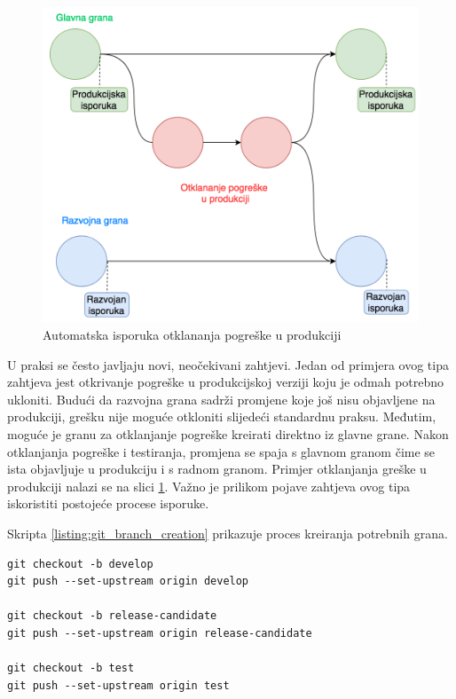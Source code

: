 \documentclass[times, utf8, diplomski, numeric]{fer}
\begin{document}
\begin{figure}[b!]
\centering
\includegraphics[scale=0.5]{HotfixGitflow}
\caption{Automatska isporuka otklananja pogreške u produkciji}
\label{fig:HotfixGitflow}
\end{figure}

U praksi se često javljaju novi, neočekivani zahtjevi. Jedan od primjera ovog tipa zahtjeva jest otkrivanje pogreške u produkcijskoj verziji koju je odmah potrebno ukloniti. Budući da razvojna grana sadrži promjene koje još nisu objavljene na produkciji, grešku nije moguće otkloniti slijedeći standardnu praksu. Međutim, moguće je granu za otklanjanje pogreške kreirati direktno iz glavne grane. Nakon otklanjanja pogreške i testiranja, promjena se spaja s glavnom granom čime se ista objavljuje u produkciju i s radnom granom. Primjer otklanjanja greške u produkciji nalazi se na slici \ref{fig:HotfixGitflow}. Važno je prilikom pojave zahtjeva ovog tipa iskoristiti postojeće procese isporuke.

Skripta \ref{listing:git_branch_creation} prikazuje proces kreiranja potrebnih grana.

\begin{lstlisting}[caption=Kreiranje potrebnih grana Gitflow radnog toka, label=listing:git_branch_creation]
git checkout -b develop
git push --set-upstream origin develop

git checkout -b release-candidate
git push --set-upstream origin release-candidate

git checkout -b test
git push --set-upstream origin test
\end{lstlisting}
\end{document}
